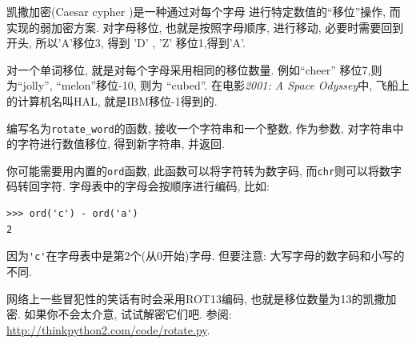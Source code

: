 \documentclass[10pt]{book}
\begin{document}
\begin{exercise}

\label{exrotate}
凯撒加密(Caesar cypher )是一种通过对每个字母
进行特定数值的``移位''操作, 而实现的弱加密方案. 
对字母移位, 也就是按照字母顺序, 进行移动, 必要时需要回到开头,  
所以'A'移位3, 得到 'D' ,   'Z' 移位1,得到'A'. 

对一个单词移位, 就是对每个字母采用相同的移位数量. 
例如``cheer'' 移位7,则为``jolly'',  ``melon''移位-10, 则为 ``cubed''. 
在电影{\em 2001: A Space Odyssey}中, 飞船上的计算机名叫HAL, 
就是IBM移位-1得到的. 


编写名为\verb"rotate_word"的函数, 接收一个字符串和一个整数, 作为参数, 
对字符串中的字符进行数值移位, 得到新字符串, 并返回. 

你可能需要用内置的{\tt ord}函数, 此函数可以将字符转为数字码, 
而{\tt chr}则可以将数字码转回字符. 
字母表中的字母会按顺序进行编码, 比如:

\begin{verbatim}
>>> ord('c') - ord('a')
2
\end{verbatim}
因为\verb"'c'"在字母表中是第2个(从0开始)字母. 
但要注意: 大写字母的数字码和小写的不同. 

网络上一些冒犯性的笑话有时会采用ROT13编码, 也就是移位数量为13的凯撒加密. 
如果你不会太介意, 试试解密它们吧. 参阅:
\url{http://thinkpython2.com/code/rotate.py}.

\end{exercise}
\end{document}

